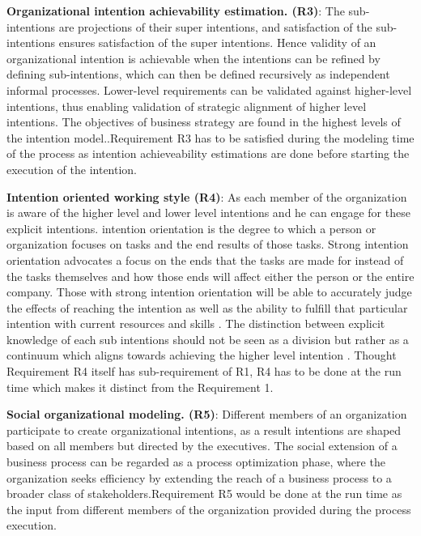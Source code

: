 \hspace{4ex} \textbf{Organizational intention achievability estimation. (R3)}: The sub-intentions are projections of their super intentions, and satisfaction of the sub-intentions ensures satisfaction of the super intentions. Hence validity of an organizational intention is achievable when the intentions can be refined by defining sub-intentions, which can then be defined recursively as independent informal processes. Lower-level requirements can be validated against higher-level intentions, thus enabling validation of strategic alignment of  higher level intentions. The objectives of business strategy are found in the highest levels of the intention model.\cite{Bleistein2006}.Requirement R3 has to be satisfied during the modeling time of the process as intention achieveability estimations are done before starting the execution of the intention.

\hspace{4ex} \textbf{Intention oriented working style (R4)}: As each member of the organization is aware of the higher level and lower level intentions and he can engage for these explicit intentions. intention orientation is the degree to which a person or organization focuses on tasks and the end results of those tasks. Strong intention orientation advocates a focus on the ends that the tasks are made for instead of the tasks themselves and how those ends will affect either the person or the entire company. Those with strong intention orientation will be able to accurately judge the effects of reaching the intention as well as the ability to fulfill that particular intention with current resources and skills \cite{Lacom}. The distinction between explicit knowledge of each sub intentions should not be seen as a division but rather as a continuum which aligns towards achieving the higher level intention . Thought Requirement R4 itself has sub-requirement of R1, R4 has to be done at the run time which makes it distinct from the Requirement 1.

\hspace{4ex} \textbf{Social organizational modeling. (R5)}: Different members of an organization participate to create organizational intentions, as a result intentions are shaped based on all members but directed by the executives. The  social  extension  of  a  business  process  can  be  regarded  as  a  process optimization phase, where the organization seeks efficiency  by  extending  the  reach  of  a  business  process  to  a  broader  class  of  stakeholders\cite{Brambilla2012}.Requirement R5 would be done at the run time as the input from different members of the organization provided during the process execution.


